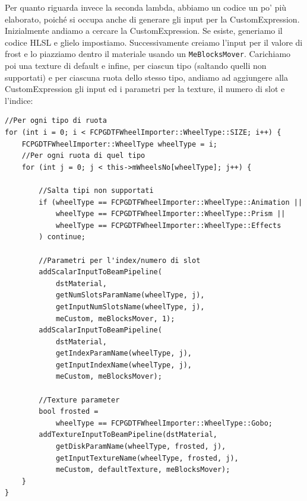 \documentclass[main.tex]{subfiles}
\begin{document}
Per quanto riguarda invece la seconda lambda, abbiamo un codice un po' più elaborato, poiché si occupa anche di generare gli input per la CustomExpression. \newline
Inizialmente andiamo a cercare la CustomExpression. Se esiste, generiamo il codice HLSL e glielo impostiamo. Successivamente creiamo l'input per il valore di frost e lo piazziamo dentro il materiale usando un \lstinline{MeBlocksMover}.
%    
Carichiamo poi una texture di default e infine, per ciascun tipo (saltando quelli non supportati) e per ciascuna ruota dello stesso tipo, andiamo ad aggiungere alla CustomExpression gli input ed i parametri per la texture, il numero di slot e l'indice:
\begin{lstlisting}
//Per ogni tipo di ruota
for (int i = 0; i < FCPGDTFWheelImporter::WheelType::SIZE; i++) {
    FCPGDTFWheelImporter::WheelType wheelType = i;
    //Per ogni ruota di quel tipo
    for (int j = 0; j < this->mWheelsNo[wheelType]; j++) {

        //Salta tipi non supportati
        if (wheelType == FCPGDTFWheelImporter::WheelType::Animation ||
            wheelType == FCPGDTFWheelImporter::WheelType::Prism ||
            wheelType == FCPGDTFWheelImporter::WheelType::Effects
        ) continue;

        //Parametri per l'index/numero di slot
        addScalarInputToBeamPipeline(
            dstMaterial,
            getNumSlotsParamName(wheelType, j),
            getInputNumSlotsName(wheelType, j),
            meCustom, meBlocksMover, 1);
        addScalarInputToBeamPipeline(
            dstMaterial,
            getIndexParamName(wheelType, j),
            getInputIndexName(wheelType, j),
            meCustom, meBlocksMover);

        //Texture parameter
        bool frosted =
            wheelType == FCPGDTFWheelImporter::WheelType::Gobo;
        addTextureInputToBeamPipeline(dstMaterial,
            getDiskParamName(wheelType, frosted, j),
            getInputTextureName(wheelType, frosted, j),
            meCustom, defaultTexture, meBlocksMover);
    }
}
\end{lstlisting}
\end{document}

